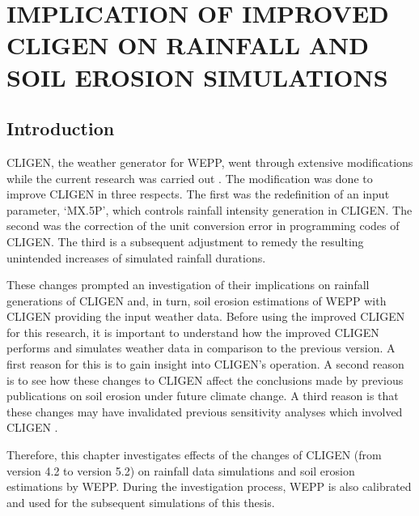 
\chapter{IMPLICATION OF IMPROVED CLIGEN ON RAINFALL AND SOIL EROSION
SIMULATIONS}
\label{sec:IMPLICATIONSOFIMPROVEDCLIGEN}

\section{Introduction}
\label{sec:ImprovedCligenIntroduction}
CLIGEN, the weather generator for WEPP, went through extensive modifications
while the current research was carried out \citep{yu2000-301}. The modification
was done to improve CLIGEN in three respects. The first was the redefinition of
an input parameter, `{MX.5P}', which controls rainfall intensity generation in
CLIGEN. The second was the correction of the unit conversion error in
programming codes of CLIGEN. The third is a subsequent adjustment to remedy the
resulting unintended increases of simulated rainfall durations.

These changes prompted an investigation of their implications on
rainfall generations of CLIGEN and, in turn, soil erosion estimations of WEPP
with CLIGEN providing the input weather data.
Before using the improved CLIGEN for this research, it is important to
understand how the improved CLIGEN performs and simulates weather data in
comparison to the previous version.
A first reason for this is to gain insight into CLIGEN's operation. A second
reason is to see how these changes to CLIGEN affect the conclusions made by
previous publications on soil erosion under future climate change. A third
reason is that these changes may have invalidated previous sensitivity analyses
which involved CLIGEN \citep{baffaut1996-447,zhang1996-855,baffaut1998-756,
favis-mortlock1998-141, favis-mortlock1999-329}.

Therefore, this chapter investigates effects of the changes of CLIGEN (from
version 4.2 to version 5.2) on rainfall data simulations and soil erosion
estimations by WEPP. During the investigation process, WEPP is also calibrated
and used for the subsequent simulations of this thesis.

